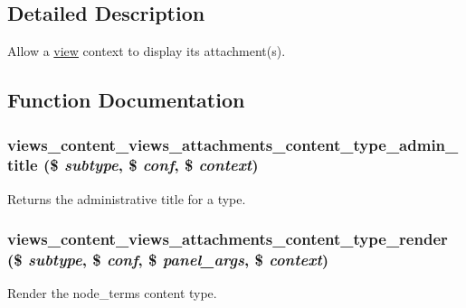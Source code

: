 \subsection{Detailed Description}
Allow a \hyperlink{classview}{view} context to display its attachment(s). 

\subsection{Function Documentation}
\hypertarget{views__attachments_8inc_a51ae0ef08eb4eb0ab92f2b739baaddde}{
\subsubsection[{views\_\-content\_\-views\_\-attachments\_\-content\_\-type\_\-admin\_\-title}]{\setlength{\rightskip}{0pt plus 5cm}views\_\-content\_\-views\_\-attachments\_\-content\_\-type\_\-admin\_\-title (\$ {\em subtype}, \/  \$ {\em conf}, \/  \$ {\em context})}}
\label{views__attachments_8inc_a51ae0ef08eb4eb0ab92f2b739baaddde}
Returns the administrative title for a type. \hypertarget{views__attachments_8inc_a5016c22df7090cb06e4ae47745479067}{
\subsubsection[{views\_\-content\_\-views\_\-attachments\_\-content\_\-type\_\-render}]{\setlength{\rightskip}{0pt plus 5cm}views\_\-content\_\-views\_\-attachments\_\-content\_\-type\_\-render (\$ {\em subtype}, \/  \$ {\em conf}, \/  \$ {\em panel\_\-args}, \/  \$ {\em context})}}
\label{views__attachments_8inc_a5016c22df7090cb06e4ae47745479067}
Render the node\_\-terms content type. 

